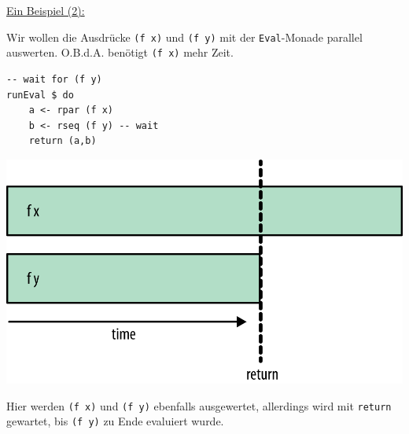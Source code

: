 \documentclass{beamer}
\begin{document}
\begin{frame}[fragile]
\underline{Ein Beispiel (2):}\smallskip

Wir wollen die Ausdrücke \texttt{(f x)} und \texttt{(f y)} mit der \texttt{Eval}-Monade parallel auswerten. O.B.d.A. benötigt \texttt{(f x)} mehr Zeit.

\begin{multicols}{2}
\begin{verbatim}
-- wait for (f y)
runEval $ do
    a <- rpar (f x)
    b <- rseq (f y) -- wait
    return (a,b)
\end{verbatim}
\columnbreak
\pause
\includegraphics[scale=0.7]{evalmonad_02.png}
\end{multicols}
\pause

Hier werden \texttt{(f x)} und \texttt{(f y)} ebenfalls ausgewertet,
allerdings wird mit \texttt{return} gewartet, bis \texttt{(f y)} zu Ende evaluiert wurde.
\end{frame}


\end{document}
